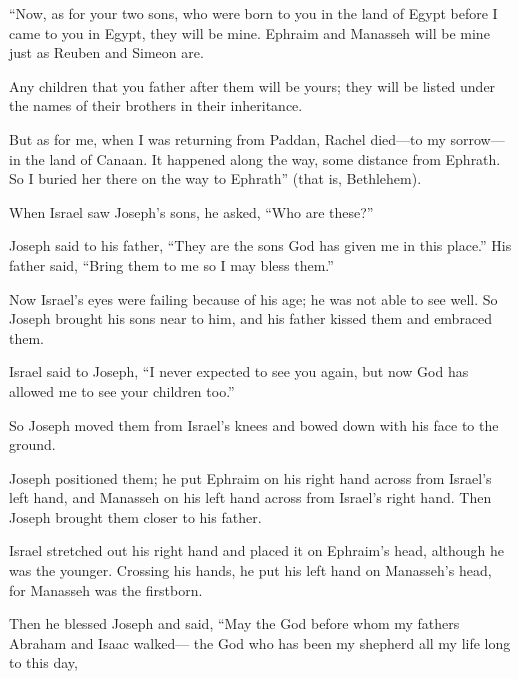 \begin{scripture}
 ``Now, as for your two sons, who were born to you in the land of Egypt before I came to you in Egypt, they will be mine. Ephraim and Manasseh will be mine just as Reuben and Simeon are.
 Any children that you father after them will be yours; they will be listed under the names of their brothers in their inheritance.
 But as for me, when I was returning from Paddan, Rachel died---to my sorrow---in the land of Canaan. It happened along the way, some distance from Ephrath. So I buried her there on the way to Ephrath'' (that is, Bethlehem).
\everypar{}

 When Israel saw Joseph's sons, he asked, ``Who are these?''
 Joseph said to his father, ``They are the sons God has given me in this place.'' His father said, ``Bring them to me so I may bless them.''
 Now Israel's eyes were failing because of his age; he was not able to see well. So Joseph brought his sons near to him, and his father kissed them and embraced them.
 Israel said to Joseph, ``I never expected to see you again, but now God has allowed me to see your children too.''
\everypar{}

 So Joseph moved them from Israel's knees and bowed down with his face to the ground.
 Joseph positioned them; he put Ephraim on his right hand across from Israel's left hand, and Manasseh on his left hand across from Israel's right hand. Then Joseph brought them closer to his father.
 Israel stretched out his right hand and placed it on Ephraim's head, although he was the younger. Crossing his hands, he put his left hand on Manasseh's head, for Manasseh was the firstborn.
\everypar{}

 Then he blessed Joseph and said, ``May the God before whom my fathers Abraham and Isaac walked--- the God who has been my shepherd all my life long to this day,
\everypar{}


\end{scripture}
